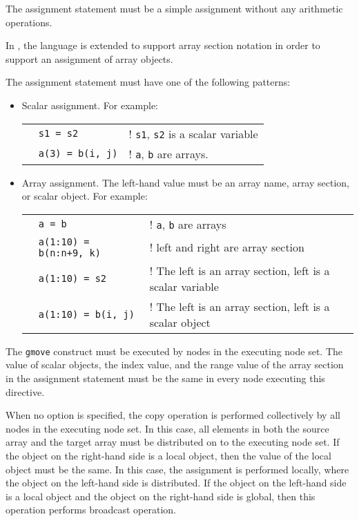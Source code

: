 The assignment statement must be a simple assignment without
any arithmetic operations.   

In {\XMP}, the {\C} language is extended to support array section
notation in order to support an assignment of array objects.

The assignment statement must have one of the following patterns:

\begin{itemize}
\item  Scalar assignment. For example:

\begin{tabular}{lll}
\hspace{0.5cm} & {\tt s1 = s2} & ! {\tt s1}, {\tt s2} is a scalar
variable \\ 
& {\tt a(3) = b(i, j)} & ! {\tt a}, {\tt b} are arrays. \\
\end{tabular}

\item Array assignment. The left-hand value must be an array name,
array section, or scalar object. For example:

\begin{tabular}{lll}
\hspace{0.5cm} & {\tt a = b} & ! {\tt a}, {\tt b} are arrays \\
 & {\tt a(1:10) = b(n:n+9, k)} & ! left and right are array section \\
 & {\tt a(1:10) = s2} & ! The left is an array section, left is a
 scalar variable \\
 & {\tt a(1:10) = b(i, j)} & ! The left is an array section, left is a
 scalar object \\
\end{tabular}
\end{itemize}

The {\tt gmove} construct must be executed by nodes in the executing
node set. The value of scalar objects, the index value, and the range
value of the array section in the assignment statement must be the same in
every node executing this directive.

When no option is specified, the copy operation is performed
collectively by all nodes in the executing node set. In this case, all
elements in both the source array and the target array must be distributed on
to the executing node set. If the object on the right-hand side is a local
object, then the value of the local object must be the same. In this case, the
assignment is performed locally, where the object on the left-hand side is 
distributed. If the object on the left-hand side is a local object
and the object on the right-hand side is global, then this operation
performs broadcast operation.

